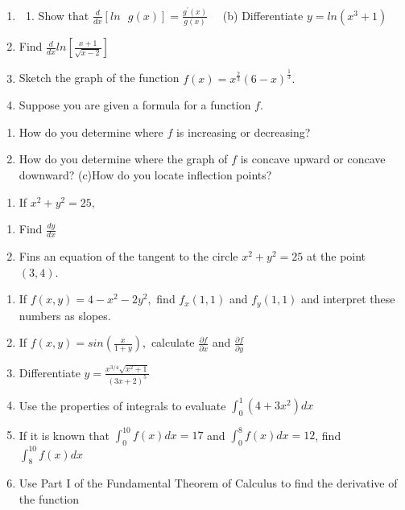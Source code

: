\documentclass[]{book}
\providecommand{\tightlist}{%
  \setlength{\itemsep}{0pt}\setlength{\parskip}{0pt}}
\begin{document}
\begin{enumerate}
\def\labelenumi{\arabic{enumi}.}
\setcounter{enumi}{17}
\item
  \begin{enumerate}
  \def\labelenumii{(\alph{enumii})}
  \tightlist
  \item
    Show that \(\frac{d}{dx} [ln \text{ }g(x)]= \frac{g^\prime (x)}{g(x)}\) \(\text{    }\) (b) Differentiate \(y=ln (x^3+1)\)
  \end{enumerate}
\item
  Find \(\frac{d}{dx} ln \left[ \frac{x+1}{\sqrt{x-2}}\right]\)
\item
  Sketch the graph of the function \(f(x) = x^{\frac{2}{3}}(6-x)^{\frac{1}{3}}.\)
\item
  Suppose you are given a formula for a function \(f\).
\end{enumerate}

\begin{enumerate}
\def\labelenumi{(\alph{enumi})}
\tightlist
\item
  How do you determine where \(f\) is increasing or decreasing?
\item
  How do you determine where the graph of \(f\) is concave upward or concave downward?
  (c)How do you locate inflection points?
\end{enumerate}

\begin{enumerate}
\def\labelenumi{\arabic{enumi}.}
\setcounter{enumi}{21}
\tightlist
\item
  If \(x^2+y^2=25,\)
\end{enumerate}

\begin{enumerate}
\def\labelenumi{(\alph{enumi})}
\tightlist
\item
  Find \(\frac{dy}{dx}\)
\item
  Fins an equation of the tangent to the circle \(x^2+y^2=25\) at the point \((3,4).\)
\end{enumerate}

\begin{enumerate}
\def\labelenumi{\arabic{enumi}.}
\setcounter{enumi}{22}
\item
  If \(f(x,y) = 4-x^2-2y^2,\) find \(f_x(1,1)\) and \(f_y(1,1)\) and interpret these numbers as slopes.
\item
  If \(f(x,y) = sin\left(\frac{x}{1+y} \right),\) calculate \(\frac{\partial f}{\partial x}\) and \(\frac{\partial f}{\partial y}\)
\item
  Differentiate \(y=\frac{x^{3/4} \sqrt{x^2+1}}{(3x+2)^5}\)
\item
  Use the properties of integrals to evaluate \(\int_0^1 (4+3x^2)dx\)
\item
  If it is known that \(\int_0^{10} f(x)dx=17\) and \(\int_0^{8} f(x)dx=12\), find \(\int_8^{10} f(x)dx\)
\item
  Use Part I of the Fundamental Theorem of Calculus to find the derivative of the function
\end{enumerate}
\end{document}
